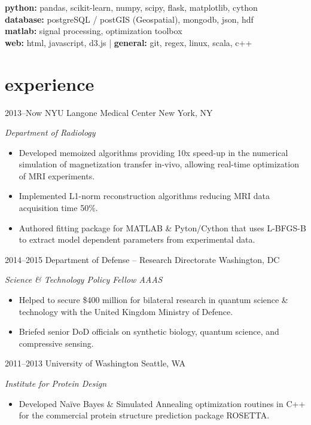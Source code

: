 \documentclass[]{friggeri-cv} %
\begin{document}
\textbf{python:} pandas, scikit-learn, numpy, scipy, flask, matplotlib, cython  \\ \textbf{database:} postgreSQL / postGIS (Geospatial), mongodb, json, hdf \\ \textbf{matlab:} signal processing, optimization toolbox \\ \textbf{web:} html, javascript, d3.js  |  \textbf{general:} git, regex, linux, scala, c++


\section{experience}


\begin{entrylist}


\entry
{2013--Now}
{NYU Langone Medical Center}
{New York, NY}
{\emph{Department of Radiology}
\begin{itemize}
\item Developed memoized algorithms providing 10x speed-up in the numerical simulation of magnetization transfer in-vivo, allowing real-time optimization of MRI experiments.
\item Implemented L1-norm reconstruction algorithms reducing MRI data acquisition time 50\%.  
\item Authored fitting package for MATLAB \& Pyton/Cython that uses L-BFGS-B to extract model dependent parameters from experimental data.    
\end{itemize}}

\entry
{2014--2015}
{Department of Defense -- Research Directorate}
{Washington, DC}
{\emph{Science \& Technology Policy Fellow AAAS}
\begin{itemize}
\item Helped to secure \$400 million for bilateral research in quantum science \& technology with the United Kingdom Ministry of Defence. 
\item Briefed senior DoD officials on synthetic biology, quantum science, and compressive sensing.
\end{itemize}}

\entry
{2011--2013}
{University of Washington}
{Seattle, WA}
{\emph{Institute for Protein Design}
\begin{itemize}
\item Developed Na{\"i}ve Bayes \& Simulated Annealing optimization routines in C++ for the commercial protein structure prediction package ROSETTA.\end{itemize}}


\end{entrylist}
\end{document}
